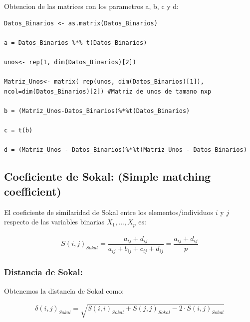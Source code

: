 \documentclass[12pt]{report} %
\begin{document}
Obtencion de las matrices con los parametros a, b, c y d:

\begin{lstlisting}
Datos_Binarios <- as.matrix(Datos_Binarios)

a = Datos_Binarios %*% t(Datos_Binarios)

unos<- rep(1, dim(Datos_Binarios)[2])

Matriz_Unos<- matrix( rep(unos, dim(Datos_Binarios)[1]), ncol=dim(Datos_Binarios)[2]) #Matriz de unos de tamano nxp

b = (Matriz_Unos-Datos_Binarios)%*%t(Datos_Binarios)

c = t(b)

d = (Matriz_Unos - Datos_Binarios)%*%t(Matriz_Unos - Datos_Binarios) 
\end{lstlisting}

\newpage





\subsection{Coeficiente de Sokal: (Simple matching coefficient)}

\begin{tcolorbox}[toptitle=2mm,title=  Coeficiente de Sokal:   ]
El coeficiente de similaridad de Sokal entre los elementos/individuos $i$ y $j$ respecto de las variables binarias $X_1,...,X_p$ es:

\begin{gather*}
S(i,j)_{Sokal}  =\dfrac{a_{ij}+d_{ij}}{a_{ij} + b_{ij} + c_{ij} +d_{ij}} = \dfrac{a_{ij}+d_{ij}}{p} 
\end{gather*}

\end{tcolorbox}

\subsubsection{Distancia de Sokal:}

\begin{tcolorbox}[toptitle=2mm,title=  Distancia de Sokal:   ]

Obtenemos la distancia de Sokal como:

\begin{gather*}
\delta(i,j)_{Sokal} = \sqrt{S(i,i)_{Sokal} +S(j,j)_{Sokal} - 2\cdot S(i,j)_{Sokal} }
\end{gather*}

\end{tcolorbox}
\end{document}
